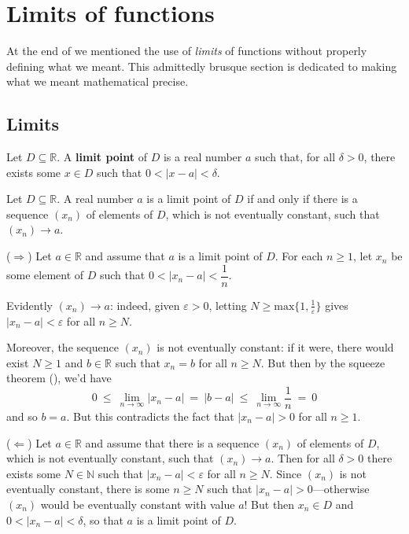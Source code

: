 \section{Limits of functions}

At the end of  we mentioned the use of \textit{limits} of functions without properly defining what we meant. This admittedly brusque section is dedicated to making what we meant mathematical precise.

\subsection*{Limits}

\begin{definition}
\label{defLimitPoint}
Let $D \subseteq \mathbb{R}$. A \textbf{limit point} of $D$ is a real number $a$ such that, for all $\delta > 0$, there exists some $x \in D$ such that $0 < |x-a| < \delta$.
\end{definition}

\begin{lemma}
Let $D \subseteq \mathbb{R}$. A real number $a$ is a limit point of $D$ if and only if there is a sequence $(x_n)$ of elements of $D$, which is not eventually constant, such that $(x_n) \to a$.
\end{lemma}

\begin{cproof}
($\Rightarrow$) Let $a \in \mathbb{R}$ and assume that $a$ is a limit point of $D$. For each $n \ge 1$, let $x_n$ be some element of $D$ such that $0 < |x_n-a| < \dfrac{1}{n}$.

Evidently $(x_n) \to a$: indeed, given $\varepsilon > 0$, letting $N \ge \mathrm{max} \{ 1, \frac{1}{\varepsilon} \}$ gives $|x_n-a| < \varepsilon$ for all $n \ge N$.

Moreover, the sequence $(x_n)$ is not eventually constant: if it were, there would exist $N \ge 1$ and $b \in \mathbb{R}$ such that $x_n=b$ for all $n \ge N$. But then by the squeeze theorem (), we'd have
\[ 0 ~\le~ \lim_{n \to \infty} |x_n-a| ~=~ |b-a| ~\le~ \lim_{n \to \infty} \dfrac{1}{n} ~=~ 0 \]
and so $b=a$. But this contradicts the fact that $|x_n-a| > 0$ for all $n \ge 1$.

($\Leftarrow$) Let $a \in \mathbb{R}$ and assume that there is a sequence $(x_n)$ of elements of $D$, which is not eventually constant, such that $(x_n) \to a$. Then for all $\delta > 0$ there exists some $N \in \mathbb{N}$ such that $|x_n-a| < \varepsilon$ for all $n \ge N$. Since $(x_n)$ is not eventually constant, there is some $n \ge N$ such that $|x_n-a| > 0$---otherwise $(x_n)$ would be eventually constant with value $a$! But then $x_n \in D$ and $0 < |x_n-a| < \delta$, so that $a$ is a limit point of $D$.
\end{cproof}


